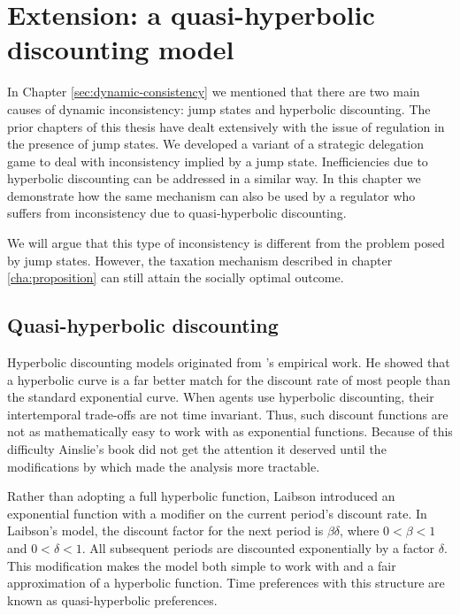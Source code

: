 \chapter[Hyperbolic discounting]{Extension: a quasi-hyperbolic discounting
model}

\label{cha:model}

In Chapter \ref{sec:dynamic-consistency} we mentioned that there are two
main causes of dynamic inconsistency: jump states and hyperbolic
discounting. The prior chapters of this thesis have dealt extensively with
the issue of regulation in the presence of jump states. We developed a
variant of a strategic delegation game to deal with inconsistency implied by
a jump state. Inefficiencies due to hyperbolic discounting can be addressed
in a similar way. In this chapter we demonstrate how the same mechanism can
also be used by a regulator who suffers from inconsistency due to
quasi-hyperbolic discounting.

We will argue that this type of inconsistency is different from the problem
posed by jump states. However, the taxation mechanism described in chapter %
\ref{cha:proposition} can still attain the socially optimal outcome.

\section{Quasi-hyperbolic discounting}

\label{sec:quasi-hyperb-disc}

Hyperbolic discounting models originated from \citet{Ainslie1992}'s
empirical work. He showed that a hyperbolic curve is a far better match for
the discount rate of most people than the standard exponential curve. When
agents use hyperbolic discounting, their intertemporal trade-offs are not
time invariant. Thus, such discount functions are not as mathematically easy
to work with as exponential functions. Because of this difficulty Ainslie's
book did not get the attention it deserved until the modifications by %
\citet{Laibson1997} which made the analysis more tractable.

Rather than adopting a full hyperbolic function, Laibson introduced an
exponential function with a modifier on the current period's discount rate.
In Laibson's model, the discount factor for the next period is $\beta \delta 
$, where $0<\beta <1$ and $0<\delta <1$. All subsequent periods are
discounted exponentially by a factor $\delta $. This modification makes the
model both simple to work with and a fair approximation of a hyperbolic
function. Time preferences with this structure are known as quasi-hyperbolic
preferences.

